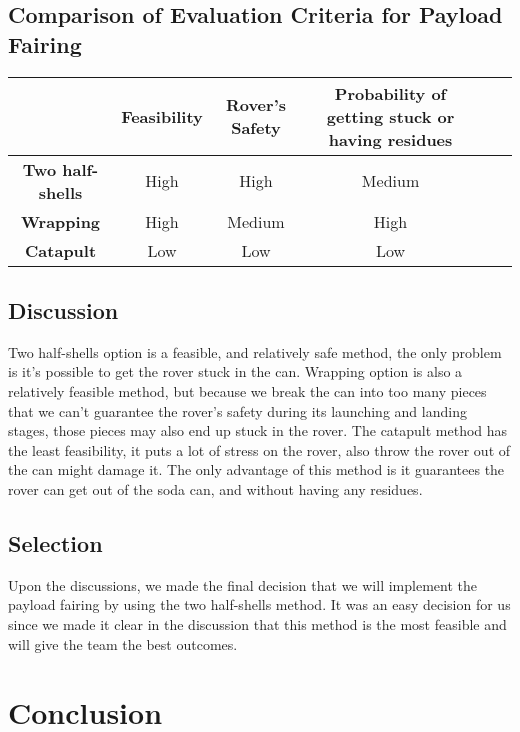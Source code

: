 \documentclass[10pt,letterpaper,onecolumn,journal]{IEEEtran}
\begin{document}
\subsection*{Comparison of Evaluation Criteria for Payload Fairing}
\begin{center}
  \begin{tabular}{cccccc}
    \hline
    \multicolumn{1}{l}{} & \textbf{Feasibility} & \textbf{Rover's Safety} & \textbf{Probability of getting stuck or having residues} \\
		\hline
		\textbf{Two half-shells}       & High & High       & Medium  \\
		\hline
		\textbf{Wrapping}		      & High  &  Medium   & High \\
		\hline
		\textbf{Catapult}			  & Low  & Low  & Low  \\
	\end{tabular}
\end{center}
\vspace{.3cm}

\subsection{Discussion}
Two half-shells option is a feasible, and relatively safe method, the only problem is it's possible to get the rover stuck in the can. Wrapping option is also a relatively feasible method, but because we break the can into too many pieces that we can't guarantee the rover's safety during its launching and landing stages, those pieces may also end up stuck in the rover. The catapult method has the least feasibility, it puts a lot of stress on the rover, also throw the rover out of the can might damage it. The only advantage of this method is it guarantees the rover can get out of the soda can, and without having any residues.  

\subsection{Selection}
Upon the discussions, we made the final decision that we will implement the payload fairing by using the two half-shells method. It was an easy decision for us since we made it clear in the discussion that this method is the most feasible and will give the team the best outcomes. 

\section{Conclusion}
\end{document}
